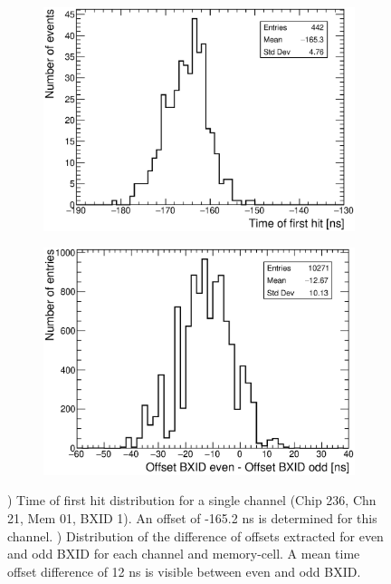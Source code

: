 \begin{figure}[htbp!]
	\begin{subfigure}[t]{0.49\textwidth}
		\centering
		\includegraphics[width=1\textwidth]{../Thesis_Plots/Timing/Muons/Plots/Timing_Chip236_Chn21_Mem01_BXID1_withOffset.eps}
		\caption{}\label{fig:TimeChnwithOffset}
	\end{subfigure}
	\hfill
	\begin{subfigure}[t]{0.49\textwidth}
		\centering
		\includegraphics[width=1\textwidth]{../Thesis_Plots/Timing/Muons/Plots/BXIDDifferenceOffsets.eps}
		\caption{}\label{fig:BXID_offset}
	\end{subfigure}
	\caption{) Time of first hit distribution for a single channel (Chip 236, Chn 21, Mem 01, BXID 1). An offset of -165.2 ns is determined for this channel. ) Distribution of the difference of offsets extracted for even and odd BXID for each channel and memory-cell. A mean time offset difference of 12 ns is visible between even and odd BXID.}
\end{figure}

